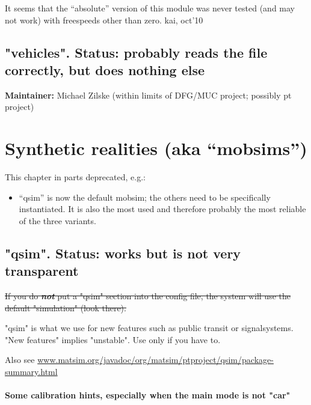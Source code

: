 It  seems that the ``absolute'' version of this module was never tested (and  may not work) with freespeeds other than zero. kai, oct'10



\vfill\eject
\section{"vehicles". Status: probably reads the file correctly, but does nothing else}

\textbf{Maintainer:} Michael Zilske (within limits of DFG/MUC project; possibly pt project)

\vfill\eject
\chapter{Synthetic realities (aka ``mobsims'')}

This chapter in parts deprecated, e.g.:
\begin{itemize}
\item
``qsim'' is now the default mobsim; the others need to be specifically
instantiated.  It is also the most used and therefore probably the most reliable of the three variants.
\end{itemize}


\section{"qsim". Status: works but is not very transparent}

\sout{If you do \textbf{\emph{not}} put a "qsim" section into the config file, the system will use the default "simulation" (look there).}

"qsim"  is what we use for new features such as public transit or  signalsystems. "New features" implies "unstable". Use only  if you have to.

Also see \href{http://www.matsim.org/javadoc/org/matsim/ptproject/qsim/package-summary.html}{www.matsim.org/javadoc/org/matsim/ptproject/qsim/package-summary.html}

\subsubsection{Some calibration hints, especially when the main mode is not "car"}

